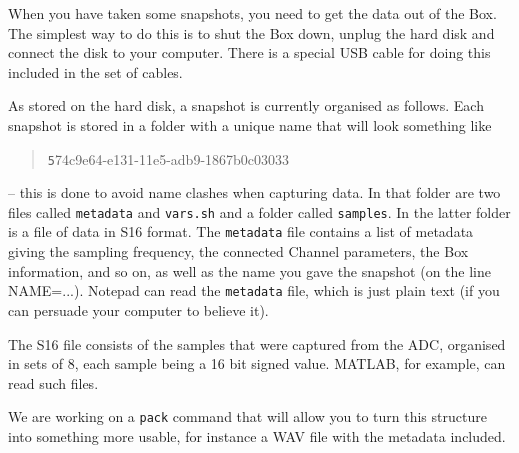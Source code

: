 \documentclass[12pt]{article}
\begin{document}
When you have taken some snapshots, you need to get the data out of
the Box.  The simplest way to do this is to shut the Box down, unplug
the hard disk and connect the disk to your computer.  There is a
special USB cable for doing this included in the set of cables.

As stored on the hard disk, a snapshot is currently organised as
follows.  Each snapshot is stored in a folder with a unique name that
will look something like
\begin{quotation}\texttt
   	574c9e64-e131-11e5-adb9-1867b0c03033
\end{quotation}
-- this is done to avoid name clashes when capturing data.  In that
folder are two files called \texttt{metadata} and \texttt{vars.sh} and
a folder called \texttt{samples}.  In the latter folder is a file of
data in S16 format.  The \texttt{metadata} file contains a list of
metadata giving the sampling frequency, the connected Channel
parameters, the Box information, and so on, as well as the name you
gave the snapshot (on the line NAME=...).  Notepad can read the
\texttt{metadata} file, which is just plain text (if you can persuade
your computer to believe it).

The S16 file consists of the samples that were captured from the ADC,
organised in sets of 8, each sample being a 16 bit signed value.
MATLAB, for example, can read such files.

We are working on a \texttt{pack} command that will allow you to turn
this structure into something more usable, for instance a WAV file
with the metadata included.
\end{document}
